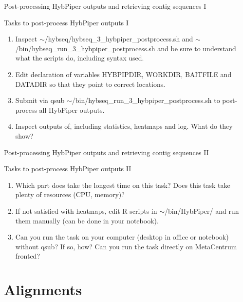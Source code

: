 \documentclass[compress, ucs, xelatex, 11pt, xcolor=x11names, aspectratio=169,
	hyperref={
		bookmarks=true,
		unicode=true,
		colorlinks=true,
		pdftitle={HybSeq course},
		plainpages=false,
		pdfauthor={Vojtech Zeisek},
		pdfsubject={Practical processing of HybSeq target enrichment sequencing data on computing grids like MetaCentrum},
		pdfcreator={XeLaTeX},
		pdfkeywords={BASH, command line, GNU, HybSeq, Linux, MetaCentrum, sequencing shell, target enrichment},
		linkcolor=Cyan2, %
		anchorcolor=Firebrick2, %
		citecolor=Firebrick2, %
		filecolor=Firebrick2, %
		menucolor=Firebrick2, %
		urlcolor=Chartreuse2, %
		pdftex},
	url={hyphens, lowtilde} %
	]{beamer}
\renewcommand{\texttt}[1]{\colorbox{Snow4}{{\ttfamily #1}}}
\begin{document}
\begin{frame}{Post-processing HybPiper outputs and retrieving contig sequences I}
	\begin{exampleblock}{Tasks to post-process HybPiper outputs I}
		\begin{enumerate}
			\item Inspect \texttt{$\sim$/hybseq/hybseq\_3\_hybpiper\_postprocess.sh} and \texttt{$\sim$/bin/hybseq\_run\_3\_hybpiper\_postprocess.sh} and be sure to understand what the scripts do, including syntax used.
			\item Edit declaration of variables \texttt{HYBPIPDIR}, \texttt{WORKDIR}, \texttt{BAITFILE} and \texttt{DATADIR} so that they point to correct locations.
			\item Submit via \texttt{qsub} \texttt{$\sim$/bin/hybseq\_run\_3\_hybpiper\_postprocess.sh} to post-process all HybPiper outputs.
			\item Inspect outputs of, including statistics, heatmaps and log. What do they show?
		\end{enumerate}
	\end{exampleblock}
\end{frame}

\begin{frame}{Post-processing HybPiper outputs and retrieving contig sequences II}
	\begin{exampleblock}{Tasks to post-process HybPiper outputs II}
		\begin{enumerate}
			\item Which part does take the longest time on this task? Does this task take plenty of resources (CPU, memory)?
			\item If not satisfied with heatmaps, edit \texttt{R} scripts in \texttt{$\sim$/bin/HybPiper/} and run them manually (can be done in your notebook).
			\item Can you run the task on your computer (desktop in office or notebook) without \texttt{qsub}? If so, how? Can you run the task directly on MetaCentrum fronted?
		\end{enumerate}
	\end{exampleblock}
\end{frame}

\section{Alignments}
\end{document}
